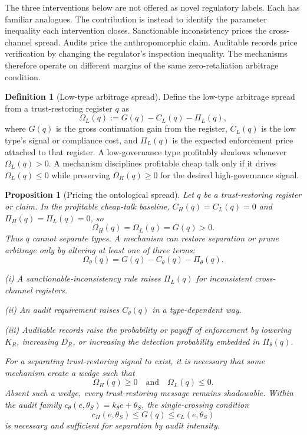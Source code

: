 \documentclass[review,authoryear]{elsarticle}
\newtheorem{proposition}{Proposition}
\theoremstyle{definition}
\newtheorem{definition}{Definition}
\theoremstyle{plain}
\begin{document}
The three interventions below are not offered as novel regulatory labels.
Each has familiar analogues.  The contribution is instead to identify the
parameter inequality each intervention closes.  Sanctionable inconsistency
prices the cross-channel spread.  Audits price the anthropomorphic claim.
Auditable records price verification by changing the regulator's inspection
inequality.  The mechanisms therefore operate on different margins of the same
zero-retaliation arbitrage condition.

\begin{definition}[Low-type arbitrage spread]
\label{def:arbitrage-spread}
Define the low-type arbitrage spread from a trust-restoring register $q$ as
\[
\Omega_L(q)
  := G(q)-C_L(q)-\Pi_L(q),
\]
where $G(q)$ is the gross continuation gain from the register,
$C_L(q)$ is the low type's signal or compliance cost, and
$\Pi_L(q)$ is the expected enforcement price attached to that register.
A low-governance type profitably shadows whenever $\Omega_L(q)>0$.
A mechanism disciplines profitable cheap talk only if it drives
$\Omega_L(q)\le 0$ while preserving $\Omega_H(q)\ge 0$ for the desired
high-governance signal.
\end{definition}

\begin{proposition}[Pricing the ontological spread]
\label{prop:pricing}
Let $q$ be a trust-restoring register or claim.  In the profitable cheap-talk
baseline, $C_H(q)=C_L(q)=0$ and $\Pi_H(q)=\Pi_L(q)=0$, so
\[
\Omega_H(q)=\Omega_L(q)=G(q)>0.
\]
Thus $q$ cannot separate types.  A mechanism can restore separation or prune
arbitrage only by altering at least one of three terms:
\[
\Omega_\theta(q)=G(q)-C_\theta(q)-\Pi_\theta(q).
\]

\emph{(i)} A sanctionable-inconsistency rule raises $\Pi_L(q)$ for inconsistent
cross-channel registers.

\emph{(ii)} An audit requirement raises $C_\theta(q)$ in a type-dependent way.

\emph{(iii)} Auditable records raise the probability or payoff of enforcement by
lowering $K_R$, increasing $D_R$, or increasing the detection probability
embedded in $\Pi_\theta(q)$.

\noindent
For a separating trust-restoring signal to exist, it is necessary that some
mechanism create a wedge such that
\[
\Omega_H(q)\ge 0 \quad \text{and} \quad \Omega_L(q)\le 0.
\]
Absent such a wedge, every trust-restoring message remains shadowable.
Within the audit family $c_\theta(e,\theta_S)=k_\theta e+\theta_S$,
the single-crossing condition
\[
c_H(e,\theta_S)\le G(q)\le c_L(e,\theta_S)
\]
is necessary and sufficient for separation by audit intensity.
\end{proposition}
\end{document}
